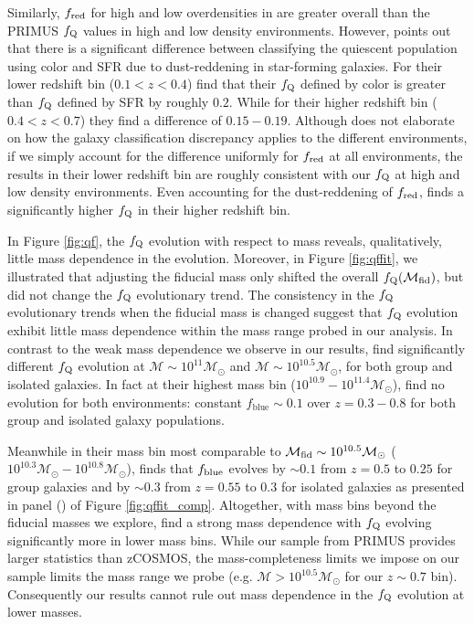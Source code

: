 \documentclass{emulateapj}
\begin{document}
Similarly, $f_{\rm{red}}$ for high and low overdensities in
\cite{Kovac:2014aa} are  greater overall than the PRIMUS $f_{\rm{Q}}$
values in high and low density environments. However,
\cite{Kovac:2014aa} points out that there is a significant difference
between classifying the quiescent population using color and SFR due to dust-reddening in star-forming galaxies. For their lower redshift bin ($0.1 < z < 0.4$) \cite{Kovac:2014aa} find that their $f_{\rm{Q}}$ defined by color is greater than $f_{\rm{Q}}$ defined by SFR by roughly $0.2$. While for their higher redshift bin ($0.4 < z < 0.7$) they find a difference of $0.15-0.19$. Although \cite{Kovac:2014aa} does not elaborate on how the galaxy classification discrepancy applies to the different environments, if we simply account for the difference uniformly for $f_{\rm{red}}$ at all environments, the \cite{Kovac:2014aa} results in their lower redshift bin are roughly consistent with our $f_{\rm{Q}}$ at high and low density environments. Even accounting for the dust-reddening of $f_{\rm{red}}$, \cite{Kovac:2014aa} finds a significantly higher $f_{\rm{Q}}$ in their higher redshift bin. 

In Figure \ref{fig:qf}, the $f_{\rm{Q}}$ evolution with respect to
mass reveals, qualitatively, little mass dependence in the
evolution. Moreover, in Figure \ref{fig:qffit}, we illustrated that
adjusting the fiducial mass only shifted the overall
$f_{\rm{Q}}(\mathcal{M}_{\rm{fid}})$, but did not change the
$f_{\rm{Q}}$ evolutionary trend. The consistency in the $f_{\rm{Q}}$
evolutionary trends when the fiducial mass is changed suggest that
$f_{\rm{Q}}$ evolution exhibit little mass dependence within the 
mass range probed in our analysis. In contrast to
the weak mass dependence we observe in our results,
\cite{Iovino:2010aa} find significantly different $f_{\rm{Q}}$
evolution at $\mathcal{M} \sim 10^{11} \mathcal{M}_{\odot}$ and
$\mathcal{M} \sim 10^{10.5} \mathcal{M}_{\odot}$, for both group and
isolated galaxies. In fact at their highest mass bin ($10^{10.9} -
10^{11.4} \mathcal{M}_{\odot}$), \cite{Iovino:2010aa} find no evolution
for both environments: constant $f_{\mathrm{blue}} \sim 0.1$ over $z =
0.3 - 0.8$ for both group and isolated galaxy populations.

Meanwhile in their mass bin most comparable to $\mathcal{M}_{\rm{fid}}
\sim 10^{10.5} \mathcal{M}_{\odot}$ ($10^{10.3} \mathcal{M}_{\odot} -
10^{10.8} \mathcal{M}_{\odot}$), \cite{Iovino:2010aa} finds that
$f_{\rm{blue}}$ evolves by $\sim 0.1$ from $z = 0.5$ to $0.25$ for
group galaxies and by $\sim 0.3$ from $z=0.55$ to $0.3$ for isolated
galaxies as presented in panel (\iovinopanel) of Figure \ref{fig:qffit_comp}. Altogether, with
mass bins beyond the fiducial masses we explore, \cite{Iovino:2010aa}
find a strong mass dependence with $f_{\rm{Q}}$ evolving significantly
more in lower mass bins. While our sample from PRIMUS provides larger
statistics than zCOSMOS, the mass-completeness limits we impose on our
sample limits the mass range we probe (e.g. $\mathcal{M} > 10^{10.5}
\mathcal{M}_{\odot}$ for our $z \sim 0.7$ bin). Consequently our
results cannot rule out mass dependence in the $f_{\rm{Q}}$ evolution
at lower masses.
\end{document}
